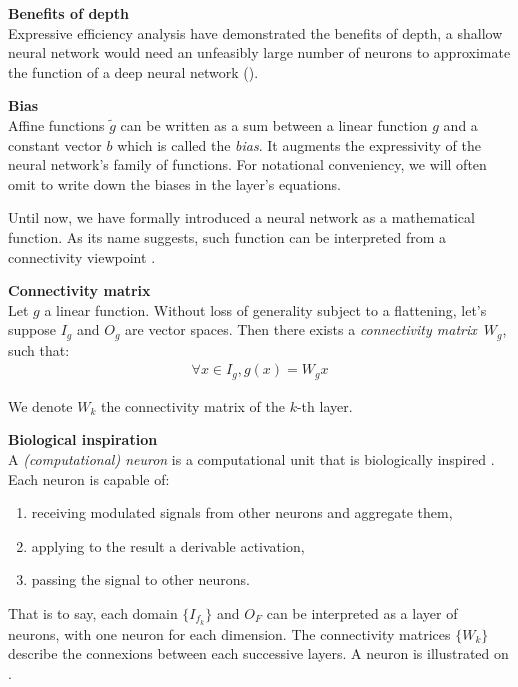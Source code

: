 \begin{remark}\textbf{Benefits of depth}\\
Expressive efficiency analysis have demonstrated the benefits of depth, \ie a shallow neural network would need an unfeasibly large number of neurons to approximate the function of a deep neural network (\eg \cite{delalleau2011shallow,bianchini2014complexity,poggio2015theory,eldan2016power,poole2016exponential,raghu2016expressive,cohen2016convolutional,mhaskar2016learning,lin2017does,arora2018understanding}).
\end{remark}

\begin{remark}\textbf{Bias}\\
Affine functions $\widetilde{g}$ can be written as a sum between a linear function $g$ and a constant vector $b$ which is called the \emph{bias}. It augments the expressivity of the neural network's family of functions. For notational conveniency, we will often omit to write down the biases in the layer's equations.
\end{remark}


Until now, we have formally introduced a neural network as a mathematical function. As its name suggests, such function can be interpreted from a connectivity viewpoint \citep{lecun-87}.

\begin{definition}\textbf{Connectivity matrix}\\
Let $g$ a linear function. Without loss of generality subject to a flattening, let's suppose $I_g$ and $O_g$ are vector spaces. Then there exists a \emph{connectivity matrix}~$W_g$, such that:
\begin{gather*}
\forall x \in I_g, g(x) = W_g x
\end{gather*}
\end{definition}
We denote $W_k$ the connectivity matrix of the $k$-th layer.

\begin{remark}\textbf{Biological inspiration}\\
A \emph{(computational) neuron} is a computational unit that is biologically inspired \citep{mcculloch1943logical}. Each neuron is capable of:
\begin{enumerate}
\item receiving modulated signals from other neurons and aggregate them,
\item applying to the result a derivable activation,
\item passing the signal to other neurons.
\end{enumerate}
That is to say, each domain $\{I_{f_k}\}$ and $O_F$ can be interpreted as a layer of neurons, with one neuron for each dimension. The connectivity matrices $\{W_k\}$ describe the connexions between each successive layers.
A neuron is illustrated on .
\end{remark}

